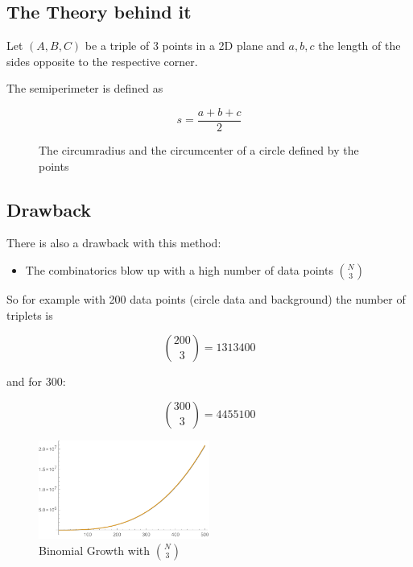 \documentclass[10pt,twoside]{scrreprt}
\begin{document}
\subsection{The Theory behind it}

Let $(A,B,C)$ be a triple of 3 points in a 2D plane and $a,b,c$ the length of the sides opposite to the respective corner.

The semiperimeter is defined as

\begin{equation}
  s = \frac{a+b+c}{2}
\end{equation}

\begin{figure}[tb]
\centering
{}
\caption{The circumradius and the circumcenter of a circle defined by the points}
\label{fig:circum_fig}
\end{figure}

\subsection{Drawback}
	

There is also a drawback with this method:

\begin{itemize}
\item The combinatorics blow up with a high number of data points \( \binom{N}{3} \)
\end{itemize}

So for example with 200 data points (circle data and background) the number of triplets is

\[ \binom{200}{3} = 1313400 \]

and for 300:

\[ \binom{300}{3} = 4455100 \]


\begin{figure}[tb]
  \centering
  \includegraphics[width=0.5\textwidth]{pics/binomial_growth}
  \caption{Binomial Growth with $\binom{N}{3}$}
  \label{fig:figure1}
\end{figure}
\end{document}
